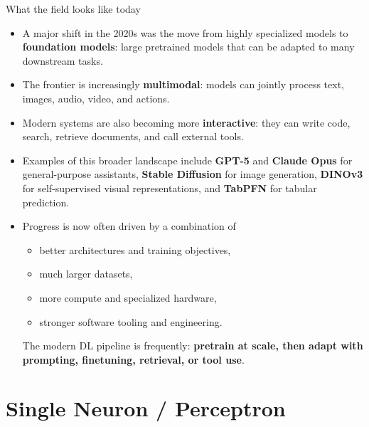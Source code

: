 \begin{vbframe}{What the field looks like today}
\vspace{.2cm}
\begin{itemize}
  \item A major shift in the 2020s was the move from highly specialized models to \textbf{foundation models}: large pretrained models that can be adapted to many downstream tasks.
\vspace{.1cm}
\item The frontier is increasingly \textbf{multimodal}: models can jointly process text, images, audio, video, and actions.
\vspace{.1cm}
\item Modern systems are also becoming more \textbf{interactive}: they can write code, search, retrieve documents, and call external tools.
\vspace{.1cm}
\item Examples of this broader landscape include \textbf{GPT-5} and \textbf{Claude Opus} for general-purpose assistants, \textbf{Stable Diffusion} for image generation, \textbf{DINOv3} for self-supervised visual representations, and \textbf{TabPFN} for tabular prediction.
\framebreak
\item Progress is now often driven by a combination of
\tiny
\begin{itemize}
\item better architectures and training objectives,
\item much larger datasets,
\item more compute and specialized hardware,
\item stronger software tooling and engineering.
\end{itemize}
\small
The modern DL pipeline is frequently: \textbf{pretrain at scale, then adapt with prompting, finetuning, retrieval, or tool use}.
\end{itemize}
\end{vbframe}


\section{Single Neuron / Perceptron}

